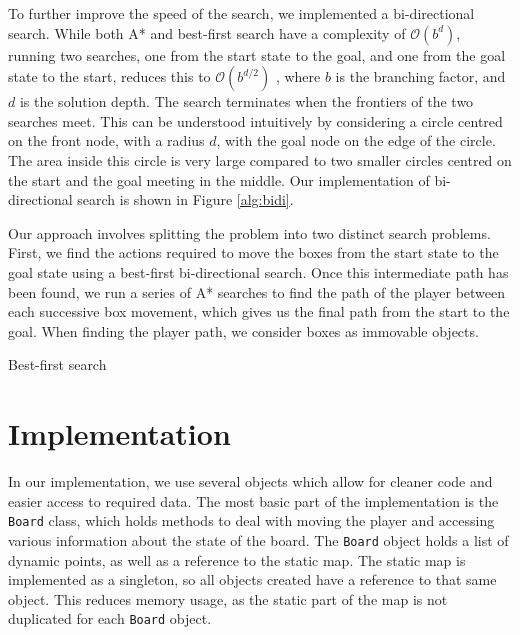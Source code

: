 \documentclass[a4paper,11pt]{article}
\begin{document}
To further improve the speed of the search, we implemented a bi-directional
search. While both A* and best-first search have a complexity of
$\mathcal{O}(b^d)$, running two searches, one from the start state to the goal,
and one from the goal state to the start, reduces this to $\mathcal{O}(b^{d/2})$
\cite{aima}, where $b$ is the branching factor, and $d$ is the solution
depth. The search terminates when the frontiers of the two searches meet. This
can be understood intuitively by considering a circle centred on the front node,
with a radius $d$, with the goal node on the edge of the circle. The area inside
this circle is very large compared to two smaller circles centred on the start
and the goal meeting in the middle. Our implementation of bi-directional search
is shown in Figure \ref{alg:bidi}.

Our approach involves splitting the problem into two distinct search
problems. First, we find the actions required to move the boxes from the start
state to the goal state using a best-first bi-directional search. Once this
intermediate path has been found, we run a series of A* searches to find the
path of the player between each successive box movement, which gives us the
final path from the start to the goal. When finding the player path, we consider
boxes as immovable objects.

\begin{algorithm}
  \DontPrintSemicolon
\caption{Best-first search}
\label{alg:bestfirst}
\end{algorithm}

\section{Implementation}
In our implementation, we use several objects which allow for cleaner code and
easier access to required data. The most basic part of the implementation is the
\texttt{Board} class, which holds methods to deal with moving the player and
accessing various information about the state of the board. The \texttt{Board}
object holds a list of dynamic points, as well as a reference to the static
map. The static map is implemented as a singleton, so all objects created have a
reference to that same object. This reduces memory usage, as the static part of
the map is not duplicated for each \texttt{Board} object.
\end{document}
